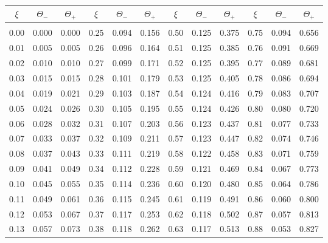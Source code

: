 \clearpage
\begin{table}[!h]
\vspace{0.25cm}
\centering
\begin{tabular}{ccc|ccc|ccc|ccc}
$\xi$ & $\Theta_-$ & $\Theta_+$ & $\xi$ & $\Theta_-$ & $\Theta_+$ & $\xi$ & $\Theta_-$ & $\Theta_+$
&$\xi$ & $\Theta_-$ & $\Theta_+$\\\hline
&&&&&&&&&&&\\[-2ex]
  0.00 &   0.000 &   0.000 &   0.25 &   0.094 &   0.156 &   0.50 &   0.125 &   0.375 &   0.75 &   0.094 &   0.656\\
  0.01 &   0.005 &   0.005 &   0.26 &   0.096 &   0.164 &   0.51 &   0.125 &   0.385 &   0.76 &   0.091 &   0.669\\
  0.02 &   0.010 &   0.010 &   0.27 &   0.099 &   0.171 &   0.52 &   0.125 &   0.395 &   0.77 &   0.089 &   0.681\\
  0.03 &   0.015 &   0.015 &   0.28 &   0.101 &   0.179 &   0.53 &   0.125 &   0.405 &   0.78 &   0.086 &   0.694\\
  0.04 &   0.019 &   0.021 &   0.29 &   0.103 &   0.187 &   0.54 &   0.124 &   0.416 &   0.79 &   0.083 &   0.707\\
  0.05 &   0.024 &   0.026 &   0.30 &   0.105 &   0.195 &   0.55 &   0.124 &   0.426 &   0.80 &   0.080 &   0.720\\
  0.06 &   0.028 &   0.032 &   0.31 &   0.107 &   0.203 &   0.56 &   0.123 &   0.437 &   0.81 &   0.077 &   0.733\\
  0.07 &   0.033 &   0.037 &   0.32 &   0.109 &   0.211 &   0.57 &   0.123 &   0.447 &   0.82 &   0.074 &   0.746\\
  0.08 &   0.037 &   0.043 &   0.33 &   0.111 &   0.219 &   0.58 &   0.122 &   0.458 &   0.83 &   0.071 &   0.759\\
  0.09 &   0.041 &   0.049 &   0.34 &   0.112 &   0.228 &   0.59 &   0.121 &   0.469 &   0.84 &   0.067 &   0.773\\
  0.10 &   0.045 &   0.055 &   0.35 &   0.114 &   0.236 &   0.60 &   0.120 &   0.480 &   0.85 &   0.064 &   0.786\\
  0.11 &   0.049 &   0.061 &   0.36 &   0.115 &   0.245 &   0.61 &   0.119 &   0.491 &   0.86 &   0.060 &   0.800\\
  0.12 &   0.053 &   0.067 &   0.37 &   0.117 &   0.253 &   0.62 &   0.118 &   0.502 &   0.87 &   0.057 &   0.813\\
  0.13 &   0.057 &   0.073 &   0.38 &   0.118 &   0.262 &   0.63 &   0.117 &   0.513 &   0.88 &   0.053 &   0.827\\

\end{tabular}
\end{table}
